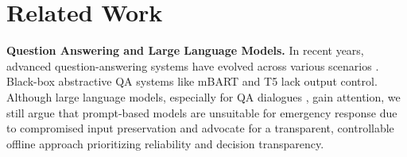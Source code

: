 \section{Related Work}

\textbf{Question Answering and Large Language Models.} In recent years, advanced question-answering systems have evolved across various scenarios \cite{chen2023cityspecshield, chen2022intelligent, chen2022cityspec, diefenbach2018core}. Black-box abstractive QA systems like mBART and T5 \cite{chipman2022mbart, raffel2019t5} lack output control. Although large language models, especially for QA dialogues \cite{brown2020language, ouyang2022training, claude2_2023}, gain attention, we still argue that prompt-based models are unsuitable for emergency response due to compromised input preservation and advocate for a transparent, controllable offline approach prioritizing reliability and decision transparency.







